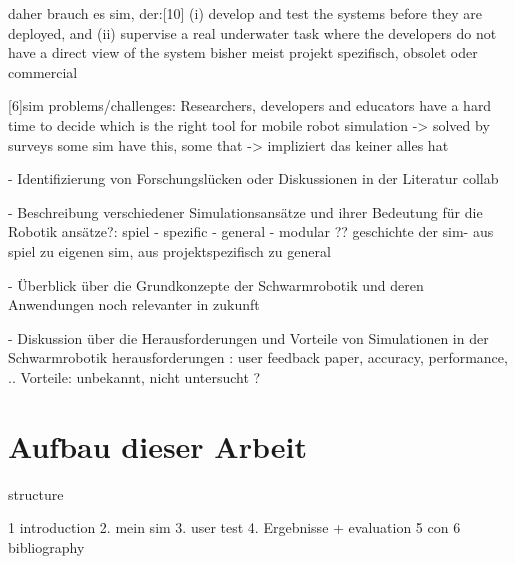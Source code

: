 \documentclass[german,version-2020-11]{uzl-thesis}
\begin{document}
  daher brauch es sim, der:[10]
  (i) develop and test the systems before they are deployed, and 
  (ii) supervise a real underwater task where the developers do not have a direct view of the system
bisher meist  projekt spezifisch, obsolet oder commercial


[6]sim problems/challenges:
      Researchers, developers and educators have a hard time to decide which is the right tool for mobile robot simulation -> solved by surveys
      some sim have this, some that -> impliziert das keiner alles hat







- Identifizierung von Forschungslücken oder Diskussionen in der Literatur   
collab


- Beschreibung verschiedener Simulationsansätze und ihrer Bedeutung für die Robotik
    ansätze?: spiel - spezific - general - modular ??
    geschichte der sim- aus spiel zu eigenen sim, aus projektspezifisch zu general


- Überblick über die Grundkonzepte der Schwarmrobotik und deren Anwendungen
    noch relevanter in zukunft


- Diskussion über die Herausforderungen und Vorteile von Simulationen in der Schwarmrobotik
    herausforderungen : user feedback paper, accuracy, performance, ..
    Vorteile: unbekannt, nicht untersucht ?


\section{Aufbau dieser Arbeit}


%

structure 

1 introduction
2. mein sim
3. user test
4. Ergebnisse + evaluation
5 con
6 bibliography









%
\end{document}
